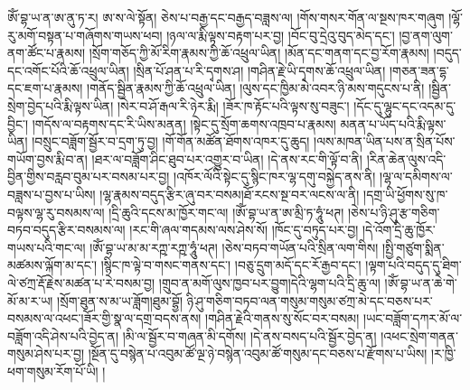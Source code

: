 ཨོཾ་བྷ་ཡ་ན་ཨ་ནུ་ཏ་ར། ཨ་ས་ལེ་སྟོན། ཅེས་པ་བརྒྱ་དང་བརྒྱད་བཟླས་ལ། །གོས་གསར་གོན་ལ་སྔས་ཁར་གཞུག །ལྷོ་རུ་མགོ་བསྟན་པ་གཞོགས་གཡས་ཕབ། །ཉལ་ལ་རྨི་ལྟས་བརྟག་པར་བྱ། །བོང་བུ་དྲེའུ་བུད་མེད་དང་། །བྱ་ནག་ལུག་ནག་ཚོང་པ་རྣམས། །སྲོག་གཅོད་ཀྱི་མོ་རིག་རྣམས་ཀྱི་ཆོ་འཕྲུལ་ཡིན། །མོན་དང་གནག་དང་བྱ་རོག་རྣམས། །བདུད་དང་འགོང་པོའི་ཆོ་འཕྲུལ་ཡིན། །སྲིན་པོ་ཤན་པ་རི་དྭགས་ཤ། །གཤིན་རྗེ་ཡི་དྭགས་ཆོ་འཕྲུལ་ཡིན། །གཅན་ཟན་དྷ་དང་ཇག་པ་རྣམས། །གནོད་སྦྱིན་རྣམས་ཀྱི་ཆོ་འཕྲུལ་ཡིན། །ལུས་དང་ཁྱིམ་མེ་འབར་ཉི་མས་གདུངས་པ་ནི། །སྦྱིན་སྲེག་བྱེད་པའི་རྨི་ལྟས་ཡིན། །སེར་བ་ཤོ་རྒལ་རི་ཉེར་རྨི། །ཟོར་ཁ་རྟོང་པའི་ལྟས་སུ་བཟུང་། །དོང་དུ་ལྷུང་དང་འདམ་དུ་བྱིང་། །གདོས་ལ་བརྟགས་དང་རི་ཡིས་མནན། །སྟེང་དུ་སྲོག་ཆགས་འཁྲབ་པ་རྣམས། མནན་པ་ཡོད་པའི་རྨི་ལྟས་ཡིན། །བསྲུང་བཟློག་སྦྱོར་བ་དྲག་ཏུ་བྱ། །གོ་གོན་མཚོན་ཐོགས་འཁར་དུ་ཆུད། །ལས་མཁན་ཡིན་པས་ན་སྲིན་པོས་གཡོག་བྱས་རྨི་བ་ན། །ཐར་ལ་བཟློག་ཤིང་ཐུབ་པར་འགྱུར་བ་ཡིན། །དེ་ནས་རང་གི་ལྟོ་བ་ནི། །རིན་ཆེན་ལུས་འདི་བྱིན་གྱིས་བརླབ་བུམ་པར་བསམ་པར་བྱ། །འཁོར་ལོའི་སྟེང་དུ་སྙིང་ཁར་ལྷ་དགུ་བསྐྱེད་ནས་ནི། །ལྷ་ལ་དམིགས་ལ་བཟླས་པ་བྱས་པ་ཡིས། །ལྷ་རྣམས་བདུད་རྩིར་ཞུ་བར་བསམ།ཐོ་རངས་སྔ་བར་ལངས་ལ་ནི། །དགྲ་ཡི་ཕྱོགས་སུ་ཁ་བལྟས་ལྷ་རུ་བསམས་ལ། །དྲི་ཆུའི་དངས་མ་ཁྱོར་གང་ལ། །ཨོཾ་བྷ་ཡ་ན་ཨ་མྲི་ཏ་ཧཱུཾ་ཕཊ། །ཅེས་པ་ཉི་ཤུ་རྩ་གཅིག་བཏབ་བདུད་རྩིར་བསམས་ལ། །རང་གི་ཞལ་གདམས་ལས་ཤེས་སོ། །ཁོང་དུ་བཏུད་པར་བྱ། །དེ་འོག་དྲི་ཆུ་ཁྱོར་གཡས་པའི་གང་ལ། །ཨོཾ་བྷ་ཡ་མ་མ་རཀྵ་རཀྵ་ཧཱུཾ་ཕཊ། །ཅེས་བཏབ་གཡོན་པའི་སྲིན་ལག་གིས། །སྤྱི་གཙུག་སྨིན་མཚམས་ལྐོག་མ་དང་། །སྙིང་ཁ་ལྟེ་བ་གསང་གནས་དང་། །བཅུ་དྲུག་མདོ་དང་རོ་རྒྱབ་དང་། །ལྟག་པའི་བདུད་དུ་ཐིག་ལེ་ཙཀྲ་རྡོ་རྗེས་མཚན་པ་རེ་བསམ་བྱ། །གྲུབ་ན་མགོ་ལུས་ཁྱབ་པར་བྱུག།དེའི་ལྷག་པའི་དྲི་ཆུ་ལ། །ཨོཾ་བྷ་ཡ་ན་ཆེ་གེ་མོ་མ་ར་ཡ། །སྲོག་ཐུན་ས་མ་ཡ་ཟློག།ཐུམ་བྷྱོ། ཉི་ཤུ་གཅིག་བཏབ་ལན་གསུམ་གསུམ་ཙཀྲ་མེ་དང་བཅས་པར་བསམས་ལ་འཕང་།ཟོར་གྱི་སྣ་ལ་དགྲ་བདས་ནས། །གཤིན་རྗེའི་གནས་སུ་སོང་བར་བསམ། །ཡང་བཟློག་དཀར་མོ་ལ་བཟློག་འདི་ཤེས་པའི་བྱེད་ན། །མི་ལ་སྦྱོར་བ་གཞན་མི་དགོས། །དེ་ནས་བསད་པའི་སྦྱོར་བྱེད་ན། །འཕང་སྲེག་གནན་གསུམ་ཤེས་པར་བྱ། །སྔོན་དུ་བསྙེན་པ་འབུམ་ཚོ་ལྔ་ཉེ་བསྙེན་འབུམ་ཚོ་གསུམ་དང་བཅས་པ་རྫོགས་པ་ཡིས། །ར་ཁྱི་ཕག་གསུམ་རོག་པོ་ཡི། །
